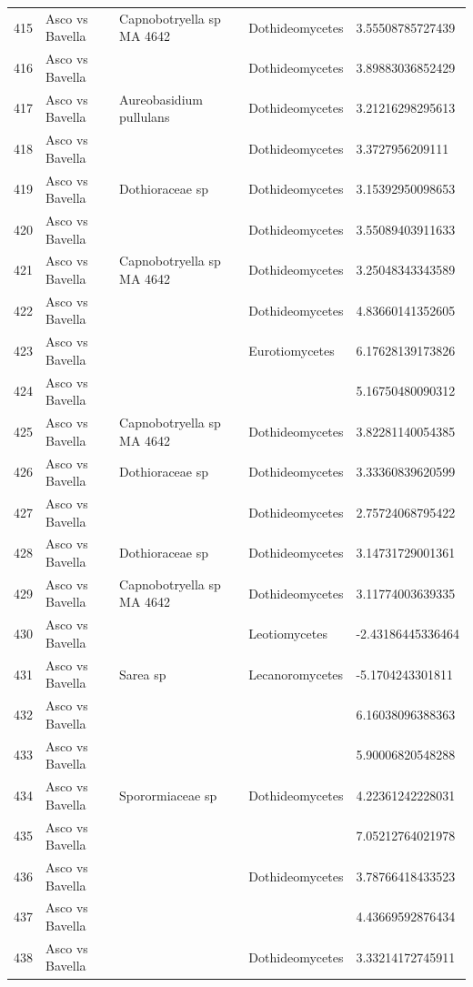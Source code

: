 \documentclass[12pt]{article}\usepackage[]{graphicx}\usepackage[]{color}
\numberwithin{figure}{section}
\begin{document}
\begin{table}[ht]
\begin{tabular}{lllll}
  415 & Asco vs Bavella & Capnobotryella sp MA 4642 & Dothideomycetes & 3.55508785727439 \\ 
  416 & Asco vs Bavella &  & Dothideomycetes & 3.89883036852429 \\ 
  417 & Asco vs Bavella & Aureobasidium pullulans & Dothideomycetes & 3.21216298295613 \\ 
  418 & Asco vs Bavella &  & Dothideomycetes & 3.3727956209111 \\ 
  419 & Asco vs Bavella & Dothioraceae sp & Dothideomycetes & 3.15392950098653 \\ 
  420 & Asco vs Bavella &  & Dothideomycetes & 3.55089403911633 \\ 
  421 & Asco vs Bavella & Capnobotryella sp MA 4642 & Dothideomycetes & 3.25048343343589 \\ 
  422 & Asco vs Bavella &  & Dothideomycetes & 4.83660141352605 \\ 
  423 & Asco vs Bavella &  & Eurotiomycetes & 6.17628139173826 \\ 
  424 & Asco vs Bavella &  &  & 5.16750480090312 \\ 
  425 & Asco vs Bavella & Capnobotryella sp MA 4642 & Dothideomycetes & 3.82281140054385 \\ 
  426 & Asco vs Bavella & Dothioraceae sp & Dothideomycetes & 3.33360839620599 \\ 
  427 & Asco vs Bavella &  & Dothideomycetes & 2.75724068795422 \\ 
  428 & Asco vs Bavella & Dothioraceae sp & Dothideomycetes & 3.14731729001361 \\ 
  429 & Asco vs Bavella & Capnobotryella sp MA 4642 & Dothideomycetes & 3.11774003639335 \\ 
  430 & Asco vs Bavella &  & Leotiomycetes & -2.43186445336464 \\ 
  431 & Asco vs Bavella & Sarea sp & Lecanoromycetes & -5.1704243301811 \\ 
  432 & Asco vs Bavella &  &  & 6.16038096388363 \\ 
  433 & Asco vs Bavella &  &  & 5.90006820548288 \\ 
  434 & Asco vs Bavella & Sporormiaceae sp & Dothideomycetes & 4.22361242228031 \\ 
  435 & Asco vs Bavella &  &  & 7.05212764021978 \\ 
  436 & Asco vs Bavella &  & Dothideomycetes & 3.78766418433523 \\ 
  437 & Asco vs Bavella &  &  & 4.43669592876434 \\ 
  438 & Asco vs Bavella &  & Dothideomycetes & 3.33214172745911 \\ 

\end{tabular}
\end{table}
\end{document}
